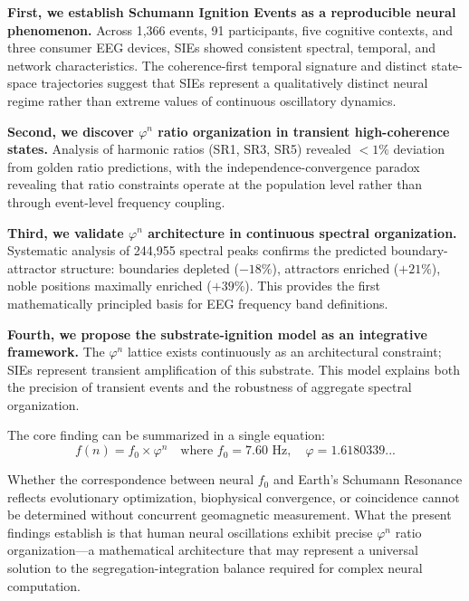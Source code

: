 \documentclass[11pt,a4paper]{article}
\newcommand{\phisym}{\varphi}
\begin{document}
\textbf{First, we establish Schumann Ignition Events as a reproducible neural phenomenon.} Across 1,366 events, 91 participants, five cognitive contexts, and three consumer EEG devices, SIEs showed consistent spectral, temporal, and network characteristics. The coherence-first temporal signature and distinct state-space trajectories suggest that SIEs represent a qualitatively distinct neural regime rather than extreme values of continuous oscillatory dynamics.

\textbf{Second, we discover $\phisym^n$ ratio organization in transient high-coherence states.} Analysis of harmonic ratios (SR1, SR3, SR5) revealed $<1\%$ deviation from golden ratio predictions, with the independence-convergence paradox revealing that ratio constraints operate at the population level rather than through event-level frequency coupling.

\textbf{Third, we validate $\phisym^n$ architecture in continuous spectral organization.} Systematic analysis of 244,955 spectral peaks confirms the predicted boundary-attractor structure: boundaries depleted ($-18\%$), attractors enriched ($+21\%$), noble positions maximally enriched ($+39\%$). This provides the first mathematically principled basis for EEG frequency band definitions.

\textbf{Fourth, we propose the substrate-ignition model as an integrative framework.} The $\phisym^n$ lattice exists continuously as an architectural constraint; SIEs represent transient amplification of this substrate. This model explains both the precision of transient events and the robustness of aggregate spectral organization.

The core finding can be summarized in a single equation:
\begin{equation}
f(n) = f_0 \times \phisym^n \quad \text{where } f_0 = 7.60 \text{ Hz}, \quad \phisym = 1.6180339...
\end{equation}

Whether the correspondence between neural $f_0$ and Earth's Schumann Resonance reflects evolutionary optimization, biophysical convergence, or coincidence cannot be determined without concurrent geomagnetic measurement. What the present findings establish is that human neural oscillations exhibit precise $\phisym^n$ ratio organization---a mathematical architecture that may represent a universal solution to the segregation-integration balance required for complex neural computation.

\printbibliography
\end{document}
